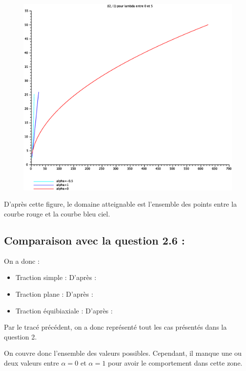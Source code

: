 \documentclass[a4paper,11pt]{article}
\begin{document}
\begin{figure}[!ht]
\centering\includegraphics[scale=0.5]{scilab/q5-1.eps}
\label{fig:5.1}
\end{figure}

D'après cette figure, le domaine atteignable est l'ensemble des points entre la courbe rouge et la courbe bleu ciel.

\subsection{Comparaison avec la question 2.6 :}
On a donc :
\begin{itemize}
\item Traction simple :
D'après : %
\item Traction plane :
D'après : %
\item Traction équibiaxiale :
D'après : %
\end{itemize}
Par le tracé précédent, on a donc représenté tout les cas présentés dans la question 2.

On couvre donc l'ensemble des valeurs possibles. Cependant, il manque une ou deux valeurs entre $\alpha = 0$ et $\alpha = 1$ pour avoir le comportement dans cette zone.

\subsection{}


\end{document}
